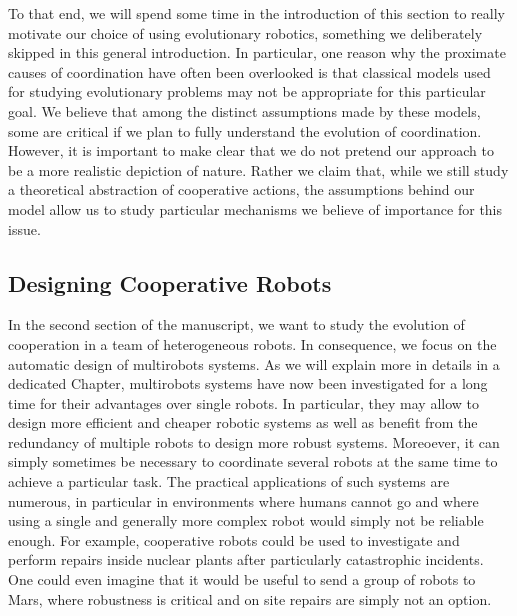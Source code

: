 
    To that end, we will spend some time in the introduction of this section to really motivate our choice of using evolutionary robotics, something we deliberately skipped in this general introduction. In particular, one reason why the proximate causes of coordination have often been overlooked is that classical models used for studying evolutionary problems may not be appropriate for this particular goal. We believe that among the distinct assumptions made by these models, some are critical if we plan to fully understand the evolution of coordination. However, it is important to make clear that we do not pretend our approach to be a more realistic depiction of nature. Rather we claim that, while we still study a theoretical abstraction of cooperative actions, the assumptions behind our model allow us to study particular mechanisms we believe of importance for this issue.


  \subsection{Designing Cooperative Robots}

    In the second section of the manuscript, we want to study the evolution of cooperation in a team of heterogeneous robots. In consequence, we focus on the automatic design of multirobots systems. As we will explain more in details in a dedicated Chapter, multirobots systems have now been investigated for a long time for their advantages over single robots. In particular, they may allow to design more efficient and cheaper robotic systems as well as benefit from the redundancy of multiple robots to design more robust systems. Moreoever, it can simply sometimes be necessary to coordinate several robots at the same time to achieve a particular task. The practical applications of such systems are numerous, in particular in environments where humans cannot go and where using a single and generally more complex robot would simply not be reliable enough. For example, cooperative robots could be used to investigate and perform repairs inside nuclear plants after particularly catastrophic incidents. One could even imagine that it would be useful to send a group of robots to Mars, where robustness is critical and on site repairs are simply not an option.

